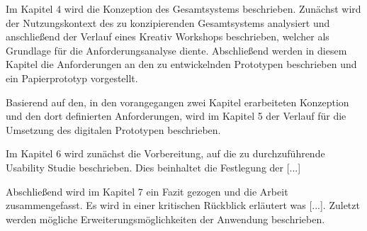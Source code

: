 Im Kapitel 4 wird die Konzeption des Gesamtsystems beschrieben. Zunächst wird der Nutzungskontext des zu konzipierenden Gesamtsystems analysiert und 
anschließend der Verlauf eines Kreativ Workshops beschrieben, welcher als Grundlage für die Anforderungsanalyse diente. Abschließend werden in diesem Kapitel 
die Anforderungen an den zu entwickelnden Prototypen beschrieben und ein Papierprototyp vorgestellt. 

Basierend auf den, in den vorangegangen zwei Kapitel erarbeiteten Konzeption und den dort definierten Anforderungen, wird im Kapitel 5 der Verlauf für die 
Umsetzung des digitalen Prototypen beschrieben.      

Im Kapitel 6 wird zunächst die Vorbereitung, auf die zu durchzuführende Usability Studie beschrieben. Dies beinhaltet die Festlegung der [...]

Abschließend wird im Kapitel 7 ein Fazit gezogen und die Arbeit zusammengefasst. Es wird in einer kritischen Rückblick erläutert was [...]. 
Zuletzt werden mögliche Erweiterungsmöglichkeiten der Anwendung beschrieben. 
